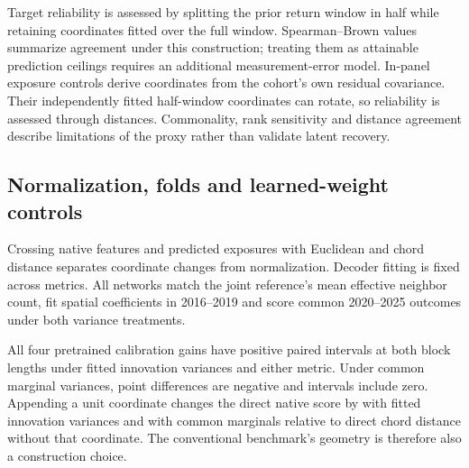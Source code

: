 \documentclass[11pt]{article}
\begin{document}
\begin{table}[htbp]
  \centering\small
  
  \caption{Exposure prediction by reporting window. Entries are unweighted means
    of annual out-of-fold $R^2$. The forecast-year window does not alter the
  exposure target or financial estimation rules.}
\end{table}
\begin{table}[htbp]
  \centering\small
  
  \caption{Reference-target diagnostics, annual means over 2016--2025.
    Commonality is the explained residual-variance share. Rank five defines
  the principal networks; ranks three and eight assess target sensitivity.}
\end{table}

Target reliability is assessed by splitting the prior return window in half
while retaining coordinates fitted over the full window.
Spearman--Brown %
values summarize agreement under this construction; treating them as attainable
prediction ceilings requires an additional measurement-error model. In-panel
exposure controls derive coordinates from the cohort's own residual covariance.
Their independently fitted half-window coordinates can rotate, so reliability
is assessed through distances. Commonality, rank sensitivity and distance
agreement describe limitations of the proxy rather than validate
latent recovery.

\subsection{Normalization, folds and learned-weight controls}
Crossing native features and predicted exposures with Euclidean and chord
distance separates coordinate changes from normalization. Decoder fitting is
fixed across metrics. All networks match the joint reference's mean effective
neighbor count, fit spatial coefficients in 2016--2019 and score common
2020--2025 outcomes under both variance treatments.

\begin{table}[htbp]
  \centering\small
  
  \caption{Calibration within each distance metric. Entries compare calibrated
    and native coordinates under Euclidean or chord distance, holding outcomes
  and neighbor-count rules common.}
\end{table}

All four pretrained calibration gains have positive paired intervals at both
block lengths under fitted innovation variances and either metric. Under
common marginal variances, point differences are negative and intervals include
zero. Appending a unit coordinate changes the direct native score by
\DirectUnitInnovation{} with fitted innovation variances and
\DirectUnitMarginal{} with common marginals relative to direct chord distance
without that coordinate. The conventional benchmark's geometry is therefore
also a construction choice.
\end{document}

